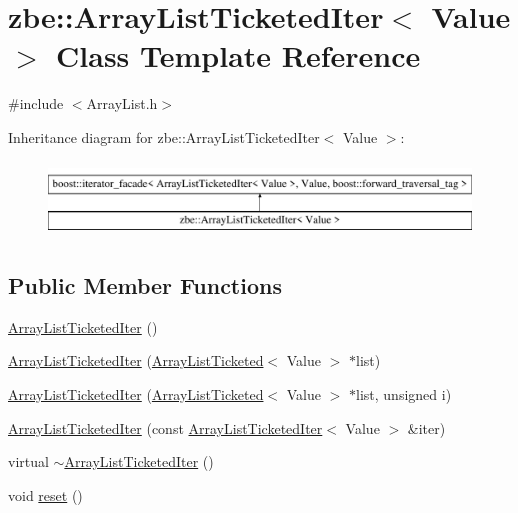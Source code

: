 \hypertarget{classzbe_1_1_array_list_ticketed_iter}{}\section{zbe\+:\+:Array\+List\+Ticketed\+Iter$<$ Value $>$ Class Template Reference}
\label{classzbe_1_1_array_list_ticketed_iter}


{\ttfamily \#include $<$Array\+List.\+h$>$}

Inheritance diagram for zbe\+:\+:Array\+List\+Ticketed\+Iter$<$ Value $>$\+:\begin{figure}[H]
\begin{center}
\leavevmode
\includegraphics[height=2.000000cm]{classzbe_1_1_array_list_ticketed_iter}
\end{center}
\end{figure}
\subsection*{Public Member Functions}
\begin{DoxyCompactItemize}
\item 
\hyperlink{classzbe_1_1_array_list_ticketed_iter_a66a8dcea6526d7d4182de6ffc75b512f}{Array\+List\+Ticketed\+Iter} ()
\item 
\hyperlink{classzbe_1_1_array_list_ticketed_iter_a682af187999fffe8df2c05b60c089820}{Array\+List\+Ticketed\+Iter} (\hyperlink{classzbe_1_1_array_list_ticketed}{Array\+List\+Ticketed}$<$ Value $>$ $\ast$list)
\item 
\hyperlink{classzbe_1_1_array_list_ticketed_iter_a1446852d8925958aa59fb6bb61913583}{Array\+List\+Ticketed\+Iter} (\hyperlink{classzbe_1_1_array_list_ticketed}{Array\+List\+Ticketed}$<$ Value $>$ $\ast$list, unsigned i)
\item 
\hyperlink{classzbe_1_1_array_list_ticketed_iter_a11ce77f4b4fd98ce4b02e9b6bbba50a9}{Array\+List\+Ticketed\+Iter} (const \hyperlink{classzbe_1_1_array_list_ticketed_iter}{Array\+List\+Ticketed\+Iter}$<$ Value $>$ \&iter)
\item 
virtual \hyperlink{classzbe_1_1_array_list_ticketed_iter_a59be66018a5a0f330d1708c2d36f63c9}{$\sim$\+Array\+List\+Ticketed\+Iter} ()
\item 
void \hyperlink{classzbe_1_1_array_list_ticketed_iter_a2780208a2abb45fceb786bf93489a4dc}{reset} ()
\end{DoxyCompactItemize}
